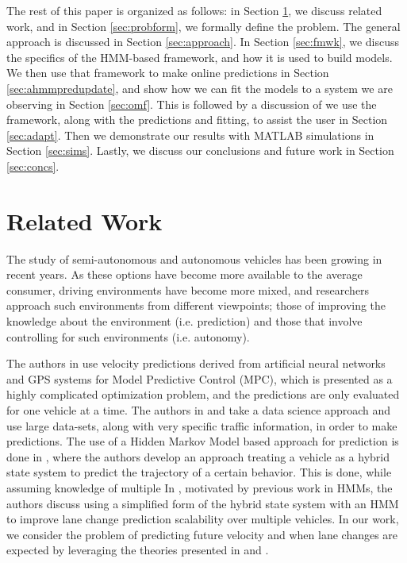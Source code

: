 \documentclass[letterpaper, 10 pt, conference]{ieeeconf}  %
\begin{document}
    
     
    The rest of this paper is organized as follows: in Section \ref{sec:relatedwork}, we discuss related work, and in Section \ref{sec:probform}, we formally define the problem. The general approach is discussed in Section \ref{sec:approach}. In Section \ref{sec:fmwk}, we discuss the specifics of the HMM-based framework, and how it is used to build models. We then use that framework to make online predictions in Section \ref{sec:ahmmpredupdate}, and show how we can fit the models to a system we are observing in Section \ref{sec:omf}. This is followed by a discussion of we use the framework, along with the predictions and fitting, to assist the user in Section \ref{sec:adapt}. Then we demonstrate our results with MATLAB simulations in Section \ref{sec:sims}. Lastly, we discuss our conclusions and future work in Section \ref{sec:concs}.

    

\section{Related Work} \label{sec:relatedwork}

The study of semi-autonomous and autonomous vehicles has been growing in recent years. As these options have become more available to the average consumer, driving environments have become more mixed, and researchers approach such environments from different viewpoints; those of improving the knowledge about the environment (i.e. prediction) and those that involve controlling for such environments (i.e. autonomy).

The authors in \cite{mpc} use velocity predictions derived from artificial neural networks and GPS systems for Model Predictive Control (MPC), which is presented as a highly complicated optimization problem, and the predictions are only evaluated for one vehicle at a time. The authors in \cite{velnn} and \cite{veldatadriv} take a data science approach and use large data-sets, along with very specific traffic information, in order to make predictions. The use of a Hidden Markov Model based approach for prediction is done in \cite{lanhmm}, where the authors develop an approach treating a vehicle as a hybrid state system to predict the trajectory of a certain behavior. This is done, while assuming knowledge of multiple In \cite{woohmm}, motivated by previous work in HMMs, the authors discuss using a simplified form of the hybrid state system with an HMM to improve lane change prediction scalability over multiple vehicles. In our work, we consider the problem of predicting future velocity and when lane changes are expected by leveraging the theories presented in \cite{mpc} and \cite{woohmm}. 
\end{document}
